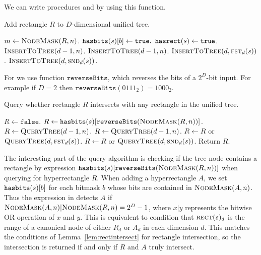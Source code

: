 \documentclass[english,gradu]{tktltiki2018}
\begin{document}
We can write procedures \adddt and \checkdt by using this function.

\begin{alg}\label{alg:uadd}
Add rectangle $R$ to $D$-dimensional unified tree.
\begin{algorithmic}
		\State $m\gets\textsc{NodeMask}(R,n)$.
				\State $\texttt{hasbits}(s)[b]\gets\texttt{true}.$
			\EndIf
		\EndFor
		\State $\texttt{hasrect}(s)\gets\texttt{true}$.
		\State $\textsc{InsertToTree}(d-1,n)$.
		\State $\textsc{InsertToTree}(d-1,n)$.
		\State $\textsc{InsertToTree}(d,\textsc{fst}_{d}(s))$.
		\State $\textsc{InsertToTree}(d,\textsc{snd}_{d}(s))$.
	\EndIf
\EndProcedure
\end{algorithmic}
\end{alg}

For \checkdt we use function $\texttt{reverseBits}$, which reverses the bits of a $2^D$-bit input.
For example if $D=2$ then $\texttt{reverseBits}(0111_2)=1000_2$.

\begin{alg}\label{alg:ucheck}
Query whether rectangle $R$ intersects with any rectangle in the unified tree.
\begin{algorithmic}
	\State $R\gets\texttt{false}$.
		\State $R\gets\texttt{hasbits}(s)[\texttt{reverseBits}(\textsc{NodeMask}(R,n))]$.
		\State $R\gets\textsc{QueryTree}(d-1,n)$.
		\State $R\gets\textsc{QueryTree}(d-1,n)$.
		\State $R\gets R$ or $\textsc{QueryTree}(d,\textsc{fst}_{d}(s))$.
		\State $R\gets R$ or $\textsc{QueryTree}(d,\textsc{snd}_{d}(s))$.
	\EndIf
	\State Return $R$.
\EndProcedure
\end{algorithmic}
\end{alg}

The interesting part of the query algorithm is checking if the tree node contains a rectangle by expression $\texttt{hasbits}(s)[\texttt{reverseBits}(\textsc{NodeMask}(R,n))]$ when querying for hyperrectangle $R$.
When adding a hyperrectangle $A$, we set $\texttt{hasbits}(s)[b]$ for each bitmask $b$ whose bits are contained in $\textsc{NodeMask}(A,n)$.
Thus the expression in \checkdt detects $A$ if $\textsc{NodeMask}(A,n)|\textsc{NodeMask}(R,n)=2^D-1$, where $x|y$ represents the bitwise OR operation of $x$ and $y$.
This is equivalent to condition that $\textsc{rect}(s)_d$ is the range of a canonical node of either $R_d$ or $A_d$ in each dimension $d$.
This matches the conditions of Lemma~\ref{lem:rectintersect} for rectangle intersection, so the intersection is returned if and only if $R$ and $A$ truly intersect.
\end{document}
